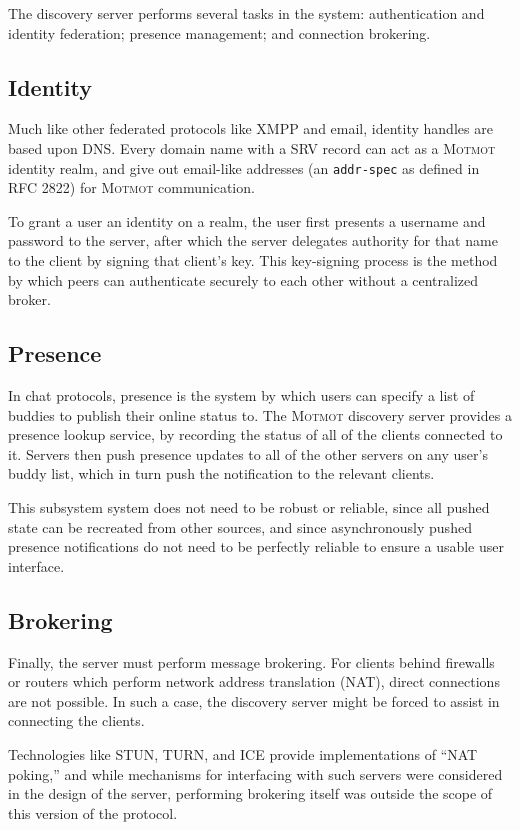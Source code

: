 \documentclass{sig-alternate}
\newcommand\Motmot{\textsc{Motmot}\xspace}
\begin{document}
The discovery server performs several tasks in the system: authentication and
identity federation; presence management; and connection brokering.

\subsection{Identity}

Much like other federated protocols like XMPP and email, identity handles are
based upon DNS. Every domain name with a SRV record can act as a \Motmot
identity realm, and give out email-like addresses (an \verb`addr-spec` as
defined in RFC 2822) for \Motmot communication.

To grant a user an identity on a realm, the user first presents a username and
password to the server, after which the server delegates authority for that name
to the client by signing that client's key. This key-signing process is the
method by which peers can authenticate securely to each other without a
centralized broker.

\subsection{Presence}

In chat protocols, presence is the system by which users can specify a list of
buddies to publish their online status to. The \Motmot discovery server provides
a presence lookup service, by recording the status of all of the clients
connected to it. Servers then push presence updates to all of the other servers
on any user's buddy list, which in turn push the notification to the relevant
clients.

This subsystem system does not need to be robust or reliable, since all pushed
state can be recreated from other sources, and since asynchronously pushed
presence notifications do not need to be perfectly reliable to ensure a usable
user interface.

\subsection{Brokering}

Finally, the server must perform message brokering. For clients behind firewalls
or routers which perform network address translation (NAT), direct connections
are not possible. In such a case, the discovery server might be forced to assist
in connecting the clients.

Technologies like STUN, TURN, and ICE provide implementations of ``NAT poking,''
and while mechanisms for interfacing with such servers were considered in the
design of the server, performing brokering itself was outside the scope of this
version of the protocol.
\end{document}
